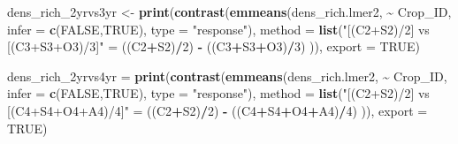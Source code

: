 \documentclass[
]{article}
\newenvironment{Shaded}{\begin{snugshade}}{\end{snugshade}}
\newcommand{\AttributeTok}[1]{\textcolor[rgb]{0.13,0.29,0.53}{#1}}
\newcommand{\ConstantTok}[1]{\textcolor[rgb]{0.56,0.35,0.01}{#1}}
\newcommand{\DecValTok}[1]{\textcolor[rgb]{0.00,0.00,0.81}{#1}}
\newcommand{\FunctionTok}[1]{\textcolor[rgb]{0.13,0.29,0.53}{\textbf{#1}}}
\newcommand{\NormalTok}[1]{#1}
\newcommand{\OtherTok}[1]{\textcolor[rgb]{0.56,0.35,0.01}{#1}}
\newcommand{\SpecialCharTok}[1]{\textcolor[rgb]{0.81,0.36,0.00}{\textbf{#1}}}
\newcommand{\StringTok}[1]{\textcolor[rgb]{0.31,0.60,0.02}{#1}}
\begin{document}
\begin{Shaded}
\begin{Highlighting}[]
\NormalTok{dens\_rich\_2yrvs3yr }\OtherTok{\textless{}{-}} \FunctionTok{print}\NormalTok{(}\FunctionTok{contrast}\NormalTok{(}\FunctionTok{emmeans}\NormalTok{(dens\_rich.lmer2, }\SpecialCharTok{\textasciitilde{}}\NormalTok{ Crop\_ID, }
                                             \AttributeTok{infer =} \FunctionTok{c}\NormalTok{(}\ConstantTok{FALSE}\NormalTok{,}\ConstantTok{TRUE}\NormalTok{), }
                                             \AttributeTok{type =} \StringTok{"response"}\NormalTok{),}
                                     \AttributeTok{method =} \FunctionTok{list}\NormalTok{(}\StringTok{"[(C2+S2)/2] vs [(C3+S3+O3)/3]"} \OtherTok{=}
\NormalTok{                                                     ((C2}\SpecialCharTok{+}\NormalTok{S2)}\SpecialCharTok{/}\DecValTok{2}\NormalTok{) }\SpecialCharTok{{-}}\NormalTok{ ((C3}\SpecialCharTok{+}\NormalTok{S3}\SpecialCharTok{+}\NormalTok{O3)}\SpecialCharTok{/}\DecValTok{3}\NormalTok{) )),}
                            \AttributeTok{export =} \ConstantTok{TRUE}\NormalTok{)}


\NormalTok{dens\_rich\_2yrvs4yr }\OtherTok{=} \FunctionTok{print}\NormalTok{(}\FunctionTok{contrast}\NormalTok{(}\FunctionTok{emmeans}\NormalTok{(dens\_rich.lmer2, }\SpecialCharTok{\textasciitilde{}}\NormalTok{ Crop\_ID,}
                                            \AttributeTok{infer =} \FunctionTok{c}\NormalTok{(}\ConstantTok{FALSE}\NormalTok{,}\ConstantTok{TRUE}\NormalTok{),}
                                            \AttributeTok{type =} \StringTok{"response"}\NormalTok{),}
                                    \AttributeTok{method =} \FunctionTok{list}\NormalTok{(}\StringTok{"[(C2+S2)/2] vs [(C4+S4+O4+A4)/4]"} \OtherTok{=}
\NormalTok{                                                    ((C2}\SpecialCharTok{+}\NormalTok{S2)}\SpecialCharTok{/}\DecValTok{2}\NormalTok{) }\SpecialCharTok{{-}}\NormalTok{ ((C4}\SpecialCharTok{+}\NormalTok{S4}\SpecialCharTok{+}\NormalTok{O4}\SpecialCharTok{+}\NormalTok{A4)}\SpecialCharTok{/}\DecValTok{4}\NormalTok{) )),}
                           \AttributeTok{export =} \ConstantTok{TRUE}\NormalTok{)}


\end{Highlighting}
\end{Shaded}
\end{document}
